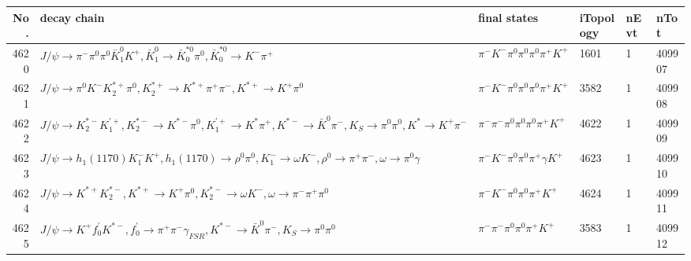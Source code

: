 \begin{table}[htbp] 
\begin{center}
\begin{small}
\begin{tabular}{rlllll}\hline\hline
 No. & decay chain & final states &  iTopology & nEvt & nTot \\\hline
4620&$J/\psi       \rightarrow \pi^{-}        \pi^{0}        \pi^{0}        \bar{K}_1^{0} K^{+}          , \bar{K}_1^{0}  \rightarrow \bar{K}_0^{*0}\pi^{0}        , \bar{K}_0^{*0} \rightarrow K^{-}          \pi^{+}        $&$\pi^{-}        K^{-}          \pi^{0}        \pi^{0}        \pi^{0}        \pi^{+}        K^{+}          $& 1601&    1&409907\\
4621&$J/\psi       \rightarrow \pi^{0}        K^{-}          K_2^{*+}       \pi^{0}        , K_2^{*+}        \rightarrow K^{*+}         \pi^{+}        \pi^{-}        , K^{*+}          \rightarrow K^{+}          \pi^{0}        $&$\pi^{-}        K^{-}          \pi^{0}        \pi^{0}        \pi^{0}        \pi^{+}        K^{+}          $& 3582&    1&409908\\
4622&$J/\psi       \rightarrow K_2^{*-}       K_1^{'+}      , K_2^{*-}        \rightarrow K^{*-}         \pi^{0}        , K_1^{'+}       \rightarrow K^{*}          \pi^{+}        , K^{*-}          \rightarrow \bar{K}^{0}   \pi^{-}        , K_{S}           \rightarrow \pi^{0}        \pi^{0}        , K^{*}           \rightarrow K^{+}          \pi^{-}        $&$\pi^{-}        \pi^{-}        \pi^{0}        \pi^{0}        \pi^{0}        \pi^{+}        K^{+}          $& 4622&    1&409909\\
4623&$J/\psi       \rightarrow h_{1}(1170)    K_{1}^{-}      K^{+}          , h_{1}(1170)     \rightarrow \rho^{0}      \pi^{0}        , K_{1}^{-}       \rightarrow \omega         K^{-}          , \rho^{0}       \rightarrow \pi^{+}        \pi^{-}        , \omega          \rightarrow \pi^{0}        \gamma       $&$\pi^{-}        K^{-}          \pi^{0}        \pi^{0}        \pi^{+}        \gamma       K^{+}          $& 4623&    1&409910\\
4624&$J/\psi       \rightarrow K^{*+}         K_2^{*-}       , K^{*+}          \rightarrow K^{+}          \pi^{0}        , K_2^{*-}        \rightarrow \omega         K^{-}          , \omega          \rightarrow \pi^{-}        \pi^{+}        \pi^{0}        $&$\pi^{-}        K^{-}          \pi^{0}        \pi^{0}        \pi^{+}        K^{+}          $& 4624&    1&409911\\
4625&$J/\psi       \rightarrow K^{+}          f^{'}_{0}     K^{*-}         , f^{'}_{0}      \rightarrow \pi^{+}        \pi^{-}        \gamma_{FSR} , K^{*-}          \rightarrow \bar{K}^{0}   \pi^{-}        , K_{S}           \rightarrow \pi^{0}        \pi^{0}        $&$\pi^{-}        \pi^{-}        \pi^{0}        \pi^{0}        \pi^{+}        K^{+}          $& 3583&    1&409912\\

\end{tabular}
\end{small}
\end{center}
\end{table}
